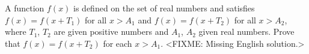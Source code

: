\problem
A function $f(x)$ is defined on the set of real numbers and satisfies
$f(x) = f(x + T_1)$ for all $x > A_1$ and
$f(x) = f(x + T_2)$ for all $x > A_2$,
where $T_1$, $T_2$ are given positive numbers and $A_1$, $A_2$ given real
numbers.
Prove that $f(x) = f(x + T_2)$ for each $x > A_1$.
\solution
<FIXME: Missing English solution.>
\endproblem
